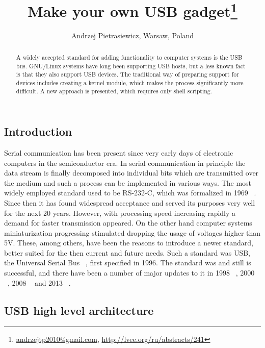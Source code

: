 \documentclass[10pt, a5paper]{article}
\begin{document}
\title{Make your own USB gadget\footnote{\url{andrzejtp2010@gmail.com}, \url{http://lvee.org/ru/abstracts/241}}}
\author{Andrzej Pietrasiewicz, Warsaw, Poland}
\maketitle
\begin{abstract}
A widely accepted standard for adding functionality to computer systems is the USB bus. GNU/Linux systems have long been supporting USB hosts, but a less known fact is that they also support USB devices. The traditional way of preparing support for devices includes creating a kernel module, which makes the process significantly more difficult. A new approach is presented, which requires only shell scripting.
\end{abstract}
\subsection*{Introduction}

Serial communication has been present since very early days of electronic computers in the semiconductor era. In serial communication in principle the data stream is finally decomposed into individual bits which are transmitted over the medium and such a process can be implemented in various ways. The most widely employed standard used to be RS-232-C, which was formalized in 1969 ~\cite{Pietrasiewicz1}. Since then it has found widespread acceptance and served its purposes very well for the next 20  years. However, with processing speed increasing rapidly a demand for faster transmission appeared. On the other hand computer systems miniaturization progressing stimulated dropping the usage of voltages higher than 5V. These, among others, have been the reasons to introduce a newer standard, better suited for the then current and future needs. Such a standard was USB, the Universal Serial Bus ~\cite{Pietrasiewicz2}, first specified in 1996. The standard was and still is successful, and there have been a number of major updates to it in 1998 ~\cite{Pietrasiewicz3}, 2000 ~\cite{Pietrasiewicz4}, 2008 ~\cite{Pietrasiewicz5} and 2013 ~\cite{Pietrasiewicz6}.

\subsection*{USB high level architecture}
\end{document}
